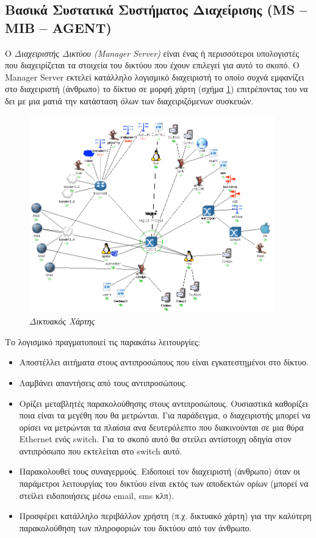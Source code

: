 %
%
\subsection{Βασικά Συστατικά Συστήματος Διαχείρισης (MS -- MIB -- AGENT)}

\begin{inthebox}
Ο \emph{Διαχειριστής Δικτύου (Manager Server)} είναι ένας ή περισσότεροι υπολογιστές που διαχειρίζεται τα στοιχεία του δικτύου που έχουν επιλεγεί για αυτό το σκοπό. Ο Manager Server εκτελεί κατάλληλο λογισμικό διαχειριστή το οποίο συχνά εμφανίζει στο διαχειριστή (άνθρωπο) το δίκτυο σε μορφή χάρτη (σχήμα \ref{7-2}) επιτρέποντας του να δει με μια ματιά την κατάσταση όλων των διαχειριζόμενων συσκευών.\\
\end{inthebox}

\begin{figure}[!ht]
 \centering
 \includegraphics[width=0.95\textwidth]{images/chapter7/7-2}
 \caption {\textsl{Δικτυακός Χάρτης}}
 \label{7-2}
\end{figure}

Το λογισμικό πραγματοποιεί τις παρακάτω λειτουργίες:

\begin{itemize}
\item Αποστέλλει αιτήματα στους αντιπροσώπους που είναι εγκατεστημένοι στο δίκτυο.
\item Λαμβάνει απαντήσεις από τους αντιπροσώπους.
\item Ορίζει μεταβλητές παρακολούθησης στους αντιπροσώπους. Ουσιαστικά καθορίζει ποια είναι τα μεγέθη που θα μετρώνται. Για παράδειγμα, ο διαχειριστής μπορεί να ορίσει να μετρώνται τα πλαίσια ανα δευτερόλεπτο που διακινούνται σε μια θύρα Ethernet ενός switch. Για το σκοπό αυτό θα στείλει αντίστοιχη οδηγία στον αντιπρόσωπο που εκτελείται στο switch αυτό.
\item Παρακολουθεί τους συναγερμούς. Ειδοποιεί τον διαχειριστή (άνθρωπο) όταν οι παράμετροι λειτουργίας του δικτύου είναι εκτός των αποδεκτών ορίων (μπορεί να στείλει ειδοποιήσεις μέσω email, sms κλπ).
\item Προσφέρει κατάλληλο περιβάλλον χρήστη (π.χ. δικτυακό χάρτη) για την καλύτερη παρακολούθηση των πληροφοριών του δικτύου από τον άνθρωπο.
\end{itemize}

